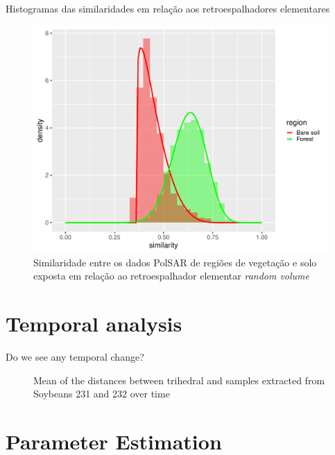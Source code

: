 \documentclass[10pt]{beamer}
\begin{document}
\begin{frame}{Histogramas das similaridades em relação aos retroespalhadores elementares}
	\begin{figure}
		\centering
		\includegraphics[width = .6\linewidth]{rv.pdf}
		\caption{Similaridade entre os dados PolSAR de regiões de vegetação e solo exposta em relação ao retroespalhador elementar \textit{random volume}}
		\label{fig:rv}
	\end{figure}
\end{frame}

\section{Temporal analysis}

\begin{frame}{Do we see any temporal change?}
\begin{figure}
\caption{Mean of the distances between trihedral and samples extracted from Soybeans 231 and 232 over time}
\label{fig:tri_mean_sb_231_232}
\end{figure}
\end{frame}

\section{Parameter Estimation}
\end{document}
